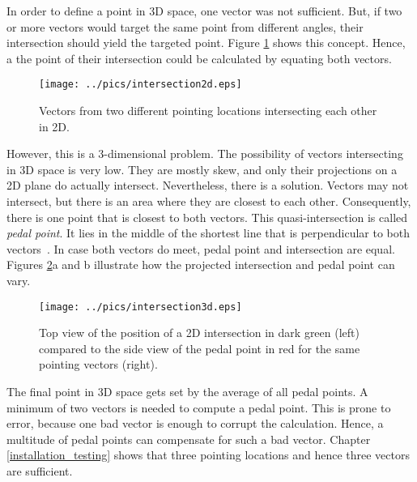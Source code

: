 In order to define a point in \ac{3D} space, one vector was not sufficient. But, if two or more vectors would target the same point from different angles, their intersection should yield the targeted point. Figure \ref{fig:principle_intersect2d} shows this concept. Hence, a the point of their intersection could be calculated by equating both vectors. 
\begin{figure}[H]%
\texttt{[image: ../pics/intersection2d.eps]}%
\caption{Vectors from two different pointing locations intersecting each other in 2D.}%
\label{fig:principle_intersect2d}%
\end{figure}
However, this is a 3-dimensional problem. The possibility of vectors intersecting in \ac{3D} space is very low. They are mostly skew, and only their projections on a \ac{2D} plane do actually intersect. Nevertheless, there is a solution. Vectors may not intersect, but there is an area where they are closest to each other. Consequently, there is one point that is closest to both vectors. This quasi-intersection is called \textit{pedal point}. It lies in the middle of the shortest line that is perpendicular to both vectors~\cite{PedalPoint}. In case both vectors do meet, pedal point and intersection are equal. Figures \ref{fig:principle_intersect3d}a and b illustrate how the projected intersection and pedal point can vary.
\begin{figure}[H]%
\texttt{[image: ../pics/intersection3d.eps]}%
\caption{Top view of the position of a 2D intersection in dark green (left) compared to the side view of the pedal point in red for the same pointing vectors (right).}%
\label{fig:principle_intersect3d}%
\end{figure}

The final point in \ac{3D} space gets set by the average of all pedal points. A minimum of two vectors is needed to compute a pedal point. This is prone to error, because one bad vector is enough to corrupt the calculation. Hence, a multitude of pedal points can compensate for such a bad vector. Chapter \ref{installation_testing} shows that three pointing locations and hence three vectors are sufficient.


